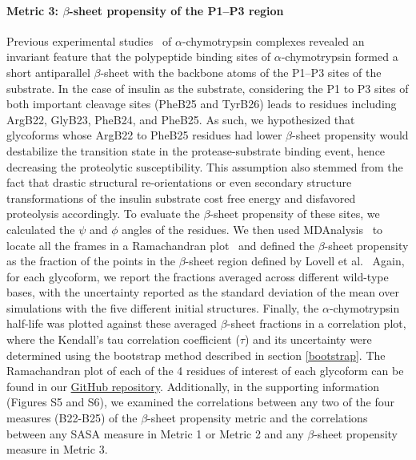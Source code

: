 \documentclass[9pt]{elife}
\begin{document}
\paragraph{Metric 3: $\beta$-sheet propensity of the P1--P3 region}
Previous experimental studies~\cite{bode1993natural,hedstrom2002serine,coombs1999revisiting} of $\alpha$-chymotrypsin complexes revealed an invariant feature that the polypeptide binding sites of $\alpha$-chymotrypsin formed a short antiparallel $\beta$-sheet with the backbone atoms of the P1--P3 sites of the substrate. In the case of insulin as the substrate, considering the P1 to P3 sites of both important cleavage sites (PheB25 and TyrB26) leads to residues including ArgB22, GlyB23, PheB24, and PheB25. As such, we hypothesized that glycoforms whose ArgB22 to PheB25 residues had lower $\beta$-sheet propensity would destabilize the transition state in the protease-substrate binding event, hence decreasing the proteolytic susceptibility. This assumption also stemmed from the fact that drastic structural re-orientations or even secondary structure transformations of the insulin substrate cost free energy and disfavored proteolysis accordingly. To evaluate the $\beta$-sheet propensity of these sites, we calculated the $\psi$ and $\phi$ angles of the residues. We then used MDAnalysis~\cite{gowers2019mdanalysis, michaud2011mdanalysis} to locate all the frames in a Ramachandran plot~\cite{ramachandran1963stereochemistry} and defined the $\beta$-sheet propensity as the fraction of the points in the $\beta$-sheet region defined by Lovell et al.~\cite{lovell2003structure} Again, for each glycoform, we report the fractions averaged across different wild-type bases, with the uncertainty reported as the standard deviation of the mean over simulations with the five different initial structures. Finally, the $\alpha$-chymotrypsin half-life was plotted against these averaged $\beta$-sheet fractions in a correlation plot, where the Kendall's tau correlation coefficient ($\tau$) and its uncertainty were determined using the bootstrap method described in section \ref{bootstrap}. The Ramachandran plot of each of the 4 residues of interest of each glycoform can be found in our \href{https://github.com/shirtsgroup/Glycoinsulin_project}{GitHub repository}. Additionally, in the supporting information (Figures S5 and S6), we examined the correlations between any two of the four measures (B22-B25) of the $\beta$-sheet propensity metric and the correlations between any SASA measure in Metric 1 or Metric 2 and any $\beta$-sheet propensity measure in Metric 3. 
\end{document}
